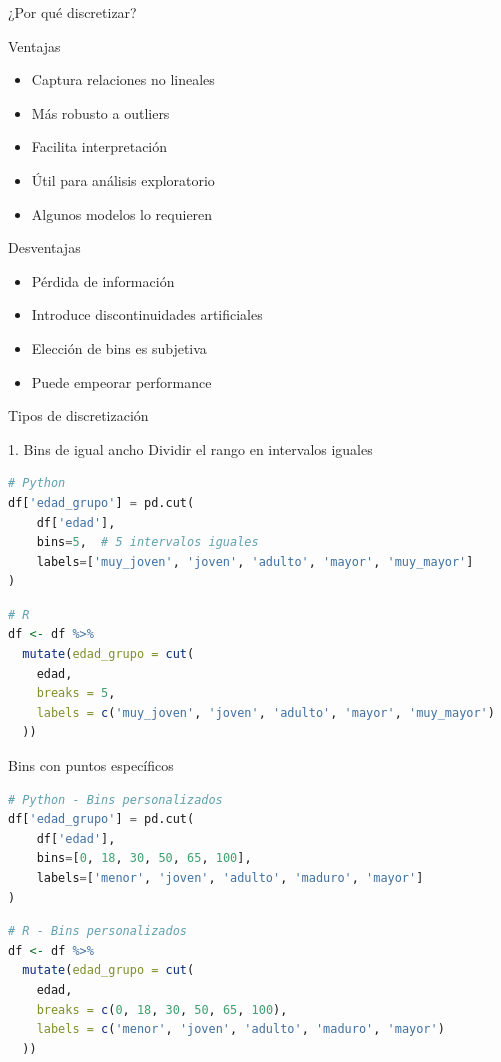 \documentclass[aspectratio=169]{beamer}
\begin{document}
\begin{frame}{¿Por qué discretizar?}
\begin{block}{Ventajas}
\begin{itemize}
    \item Captura relaciones no lineales
    \item Más robusto a outliers
    \item Facilita interpretación
    \item Útil para análisis exploratorio
    \item Algunos modelos lo requieren
\end{itemize}
\end{block}

\pause

\begin{alertblock}{Desventajas}
\begin{itemize}
    \item Pérdida de información
    \item Introduce discontinuidades artificiales
    \item Elección de bins es subjetiva
    \item Puede empeorar performance
\end{itemize}
\end{alertblock}
\end{frame}

\begin{frame}[fragile]{Tipos de discretización}
\begin{block}{1. Bins de igual ancho}
Dividir el rango en intervalos iguales
\end{block}

\begin{lstlisting}[language=Python]
# Python
df['edad_grupo'] = pd.cut(
    df['edad'],
    bins=5,  # 5 intervalos iguales
    labels=['muy_joven', 'joven', 'adulto', 'mayor', 'muy_mayor']
)
\end{lstlisting}

\begin{lstlisting}[language=R]
# R
df <- df %>%
  mutate(edad_grupo = cut(
    edad,
    breaks = 5,
    labels = c('muy_joven', 'joven', 'adulto', 'mayor', 'muy_mayor')
  ))
\end{lstlisting}
\end{frame}

\begin{frame}[fragile]{Bins con puntos específicos}
\begin{lstlisting}[language=Python]
# Python - Bins personalizados
df['edad_grupo'] = pd.cut(
    df['edad'],
    bins=[0, 18, 30, 50, 65, 100],
    labels=['menor', 'joven', 'adulto', 'maduro', 'mayor']
)
\end{lstlisting}

\begin{lstlisting}[language=R]
# R - Bins personalizados
df <- df %>%
  mutate(edad_grupo = cut(
    edad,
    breaks = c(0, 18, 30, 50, 65, 100),
    labels = c('menor', 'joven', 'adulto', 'maduro', 'mayor')
  ))
\end{lstlisting}
\end{frame}
\end{document}
